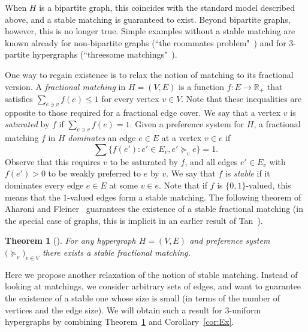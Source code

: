 \documentclass[10pt,a4paper]{amsart}
\newtheorem{theorem}{Theorem}[section]
\begin{document}
When $H$ is a bipartite graph, this coincides with the standard model described above, and a stable matching is guaranteed to exist. Beyond bipartite graphs, however, this is no longer true. Simple examples without a stable matching are known already for non-bipartite graphs (``the roommates problem"~\cite{GS}) and for $3$-partite hypergraphs (``threesome matchings"~\cite{Al}).

One way to regain existence is to relax the notion of matching to its fractional version. A \emph{fractional matching} in $H = (V, E)$ is a function $f: E \to \mathbb{R}_+$ that satisfies $\sum_{e \ni v} f(e) \le 1$ for every vertex $v \in V$. Note that these inequalities are opposite to those required for a fractional edge cover. We say that a vertex $v$ is \emph{saturated} by $f$ if $\sum_{e \ni v} f(e) = 1$. Given a preference system for $H$, a fractional matching $f$ in $H$ \emph{dominates} an edge $e \in E$ at a vertex $v \in e$ if \[ \sum \{ f(e'): e' \in E_v, e' \succeq_v e\} = 1.\] Observe that this requires $v$ to be saturated by $f$, and all edges $e' \in E_v$ with $f(e') > 0$ to be weakly preferred to $e$ by $v$. We say that $f$ is \emph{stable} if it dominates every edge $e \in E$ at some $v \in e$. Note that if $f$ is $\{0,1\}$-valued, this means that the $1$-valued edges form a stable matching. The following theorem of Aharoni and Fleiner~\cite{AF} guarantees the existence of a stable fractional matching (in the special case of graphs, this is implicit in an earlier result of Tan~\cite{Tan}).
\begin{theorem}[{\cite{AF}}] \label{thm:AF}
For any hypergraph $H = (V, E)$ and preference system $\bigl( \succeq_v\bigr)_{v \in V}$ there exists a stable fractional matching.
\end{theorem}
Here we propose another relaxation of the notion of stable matching. Instead of looking at matchings, we consider arbitrary sets of edges, and want to guarantee the existence of a stable one whose size is small (in terms of the number of vertices and the edge size). We will obtain such a result for $3$-uniform hypergraphs by combining Theorem~\ref{thm:AF} and Corollary~\ref{cor:Ex}.
\end{document}
